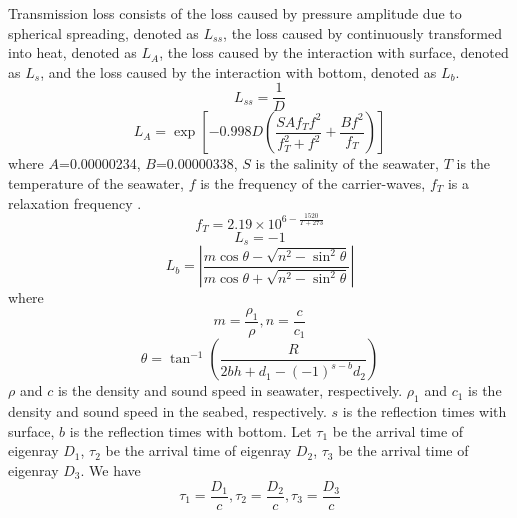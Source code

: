 \documentclass[journal]{IEEEtran}
\begin{document}
Transmission loss consists of the loss caused by pressure amplitude
due to spherical spreading, denoted as ${L_{ss}}$, the loss caused
by continuously transformed into heat, denoted as ${L_A}$, the loss
caused by the interaction with surface, denoted as ${L_s}$, and the
loss caused by the interaction with bottom, denoted as ${L_b}$.
\begin{equation}
\label{eqn_example} {L_{ss}} = \frac{1}{D}
\end{equation}
\begin{equation}
\label{eqn_example} {L_A} = \exp \left[ { -
0.998D(\frac{{SA{f_T}{f^2}}}{{f_T^2 + {f^2}}} +
\frac{{B{f^2}}}{{{f_T}}})} \right]
\end{equation}
where $A$=0.00000234, $B$=0.00000338, $S$ is the salinity of the
seawater, $T$ is the temperature of the seawater, $f$ is the
frequency of the carrier-waves, ${f_T}$ is a relaxation frequency
\cite{Brekhovskikh2002}.
\begin{equation}
\label{eqn_example} {f_T} = 2.19 \times {10^{6 - \frac{{1520}}{{T +
273}}}}
\end{equation}
\begin{equation}
\label{eqn_example} {L_s} =  - 1
\end{equation}
\begin{equation}
\label{eqn_example} {L_b} = \left| {\frac{{m\cos \theta  - \sqrt
{{n^2} -{{\sin}^2}\theta } }}{{m\cos \theta  + \sqrt {{n^2}
-{{\sin}^2}\theta }}}} \right|
\end{equation}
where
\begin{equation}
\label{eqn_example} m = \frac{{{\rho _1}}}{\rho },n =
\frac{c}{{{c_1}}}
\end{equation}
\begin{equation}
\label{eqn_example} \theta  = {\tan ^{ - 1}}\left( {\frac{R}{{2bh +
{d_1} - {{( - 1)}^{s- b}}{d_2}}}} \right)
\end{equation}
$\rho$ and $c$ is the density and sound speed in seawater,
respectively. ${\rho_1}$ and ${c_1}$ is the density and sound speed
in the seabed, respectively. $s$ is the reflection times with
surface, $b$ is the reflection times with bottom. Let ${\tau_1}$ be
the arrival time of eigenray ${D_1}$, ${\tau_2}$ be the arrival time
of eigenray ${D_2}$, ${\tau_3}$ be the arrival time of eigenray
${D_3}$. We have
\begin{equation}
\label{eqn_example} {\tau _1} = \frac{{{D_1}}}{c},{\tau _2} =
\frac{{{D_2}}}{c},{\tau _3} = \frac{{{D_3}}}{c}
\end{equation}
\end{document}
